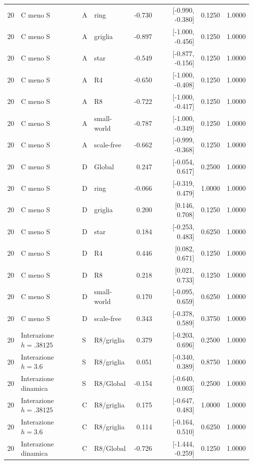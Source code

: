 \begin{longtable}{@{}rlllrrrr@{}}
20 & C meno S & A & ring & -0.730 & [-0.990, -0.380] & 0.1250 & 1.0000\\
20 & C meno S & A & griglia & -0.897 & [-1.000, -0.456] & 0.1250 & 1.0000\\
20 & C meno S & A & star & -0.549 & [-0.877, -0.156] & 0.1250 & 1.0000\\
20 & C meno S & A & R4 & -0.650 & [-1.000, -0.408] & 0.1250 & 1.0000\\
20 & C meno S & A & R8 & -0.722 & [-1.000, -0.417] & 0.1250 & 1.0000\\
20 & C meno S & A & small-world & -0.787 & [-1.000, -0.349] & 0.1250 & 1.0000\\
20 & C meno S & A & scale-free & -0.662 & [-0.999, -0.368] & 0.1250 & 1.0000\\
20 & C meno S & D & Global & 0.247 & [-0.054, 0.617] & 0.2500 & 1.0000\\
20 & C meno S & D & ring & -0.066 & [-0.319, 0.479] & 1.0000 & 1.0000\\
20 & C meno S & D & griglia & 0.200 & [0.146, 0.708] & 0.1250 & 1.0000\\
20 & C meno S & D & star & 0.184 & [-0.253, 0.483] & 0.6250 & 1.0000\\
20 & C meno S & D & R4 & 0.446 & [0.082, 0.671] & 0.1250 & 1.0000\\
20 & C meno S & D & R8 & 0.218 & [0.021, 0.733] & 0.1250 & 1.0000\\
20 & C meno S & D & small-world & 0.170 & [-0.095, 0.659] & 0.6250 & 1.0000\\
20 & C meno S & D & scale-free & 0.343 & [-0.378, 0.589] & 0.3750 & 1.0000\\
20 & Interazione $h=.38125$ & S & R8/griglia & 0.379 & [-0.203, 0.696] & 0.2500 & 1.0000\\
20 & Interazione $h=3.6$ & S & R8/griglia & 0.051 & [-0.340, 0.389] & 0.8750 & 1.0000\\
20 & Interazione dinamica & S & R8/Global & -0.154 & [-0.640, 0.003] & 0.2500 & 1.0000\\
20 & Interazione $h=.38125$ & C & R8/griglia & 0.175 & [-0.647, 0.483] & 1.0000 & 1.0000\\
20 & Interazione $h=3.6$ & C & R8/griglia & 0.114 & [-0.164, 0.510] & 0.6250 & 1.0000\\
20 & Interazione dinamica & C & R8/Global & -0.726 & [-1.444, -0.259] & 0.1250 & 1.0000\\
\end{longtable}\normalsize

